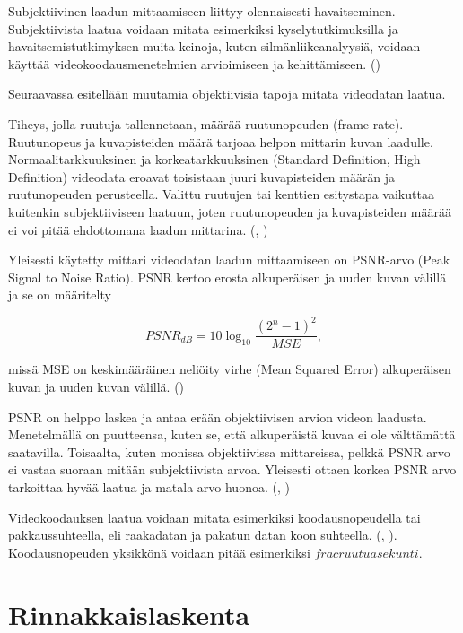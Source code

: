 Subjektiivinen laadun mittaamiseen liittyy olennaisesti havaitseminen.
Subjektiivista laatua voidaan mitata esimerkiksi kyselytutkimuksilla ja
havaitsemistutkimyksen muita keinoja, kuten silmänliikeanalyysiä, voidaan
käyttää videokoodausmenetelmien arvioimiseen ja kehittämiseen. (\citealt{perception})

Seuraavassa esitellään muutamia objektiivisia tapoja mitata videodatan laatua.

Tiheys, jolla ruutuja tallennetaan, määrää ruutunopeuden (frame rate).
Ruutunopeus ja kuvapisteiden määrä tarjoaa helpon mittarin kuvan laadulle.
Normaalitarkkuuksinen ja korkeatarkkuuksinen (Standard Definition, High
Definition) videodata eroavat toisistaan juuri kuvapisteiden määrän ja
ruutunopeuden perusteella. Valittu ruutujen tai kenttien esitystapa vaikuttaa
kuitenkin subjektiiviseen laatuun, joten ruutunopeuden ja kuvapisteiden määrää
ei voi pitää ehdottomana laadun mittarina. (\citealt{h264}, \citealt{du})

Yleisesti käytetty mittari videodatan laadun mittaamiseen on PSNR-arvo (Peak
Signal to Noise Ratio). PSNR kertoo erosta alkuperäisen ja uuden kuvan välillä
ja se on määritelty

\begin{center}
\begin{equation}PSNR_{dB} = 10\log_{10}\frac{(2^n - 1)^2}{MSE},\end{equation}
\end{center}

missä MSE on keskimääräinen neliöity virhe (Mean Squared Error) alkuperäisen 
kuvan ja uuden kuvan välillä. (\citealt{h264})

PSNR on helppo laskea ja antaa erään objektiivisen arvion videon laadusta.
Menetelmällä on puutteensa, kuten se, että alkuperäistä kuvaa ei ole
välttämättä saatavilla. Toisaalta, kuten monissa objektiivissa mittareissa,
pelkkä PSNR arvo ei vastaa suoraan mitään subjektiivista arvoa. Yleisesti
ottaen korkea PSNR arvo tarkoittaa hyvää laatua ja matala arvo huonoa.
(\citealt{h264}, \citealt{du})

Videokoodauksen laatua voidaan mitata esimerkiksi koodausnopeudella tai
pakkaussuhteella, eli raakadatan ja pakatun datan koon suhteella. (\citealt{li},
\citealt{xu}). Koodausnopeuden yksikkönä voidaan pitää esimerkiksi
$frac{ruutua}{sekunti}$.

\section{Rinnakkaislaskenta}
\label{chap:parallel}


